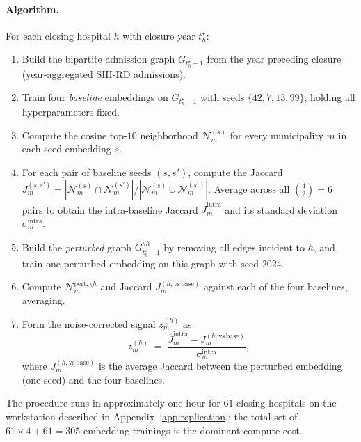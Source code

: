 \paragraph{Algorithm.} For each closing hospital $h$ with closure year
$t_h^{\star}$:

\begin{enumerate}
    \item Build the bipartite admission graph $G_{t_h^{\star} - 1}$ from
    the year preceding closure (year-aggregated SIH-RD admissions).
    \item Train four \emph{baseline} embeddings on $G_{t_h^{\star} - 1}$
    with seeds $\{42, 7, 13, 99\}$, holding all hyperparameters fixed.
    \item Compute the cosine top-$10$ neighborhood
    $\mathcal{N}_m^{(s)}$ for every municipality $m$ in each seed
    embedding $s$.
    \item For each pair of baseline seeds $(s, s')$, compute the
    Jaccard $J_m^{(s, s')} = |\mathcal{N}_m^{(s)} \cap
    \mathcal{N}_m^{(s')}| / |\mathcal{N}_m^{(s)} \cup
    \mathcal{N}_m^{(s')}|$. Average across all $\binom{4}{2} = 6$ pairs
    to obtain the intra-baseline Jaccard
    $\overline{J}_m^{\mathrm{intra}}$ and its standard deviation
    $\sigma_m^{\mathrm{intra}}$.
    \item Build the \emph{perturbed} graph $G_{t_h^{\star} - 1}^{\setminus h}$
    by removing all edges incident to $h$, and train one perturbed
    embedding on this graph with seed $2024$.
    \item Compute $\mathcal{N}_m^{\mathrm{pert}, \setminus h}$ and
    Jaccard $J_m^{(h, \mathrm{vs\,base})}$ against each of the four
    baselines, averaging.
    \item Form the noise-corrected signal $z_m^{(h)}$ as
\begin{equation}
  z_m^{(h)} \;=\;
  \frac{\overline{J}_m^{\mathrm{intra}} - J_m^{(h, \mathrm{vs\,base})}}{
        \sigma_m^{\mathrm{intra}}},
  \label{eq:z-perturbation}
\end{equation}
    where $J_m^{(h, \mathrm{vs\,base})}$ is the average Jaccard between
    the perturbed embedding (one seed) and the four baselines.
\end{enumerate}

The procedure runs in approximately one hour for $61$ closing
hospitals on the workstation described in Appendix~\ref{app:replication};
the total set of $61 \times 4 + 61 = 305$ embedding trainings is the
dominant compute cost.

